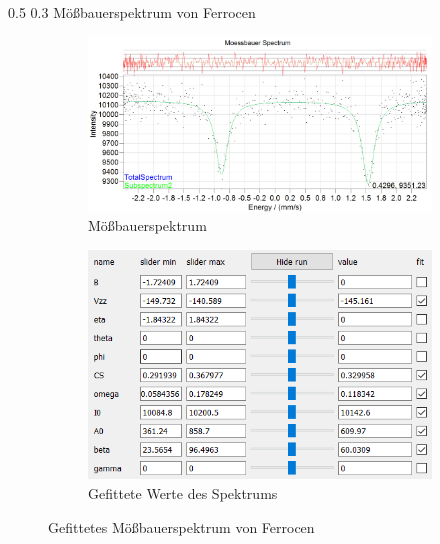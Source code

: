 \documentclass[german, %
parskip=full, %
bibliography=totoc, %
]{scrartcl}
\makeatletter
\renewcommand\subsection{\@startsection 
   {subsection}{2}{0mm}%
   {0.5\baselineskip}%
   {0.3\baselineskip}%
   {\bfseries\sffamily\large}%
   }
\makeatother
\begin{document}
\subsection{Mößbauerspektrum von Ferrocen}

\begin{figure}[ht]
	\centering
	\begin{subfigure}[b]{0.5\textwidth}
		\includegraphics[width=\textwidth]{MoessbauerFerrocen}
	  \caption{Mößbauerspektrum}
	  \label{fig:moessferrocen}
  \end{subfigure}
  \begin{subfigure}[b]{0.4\textwidth}
	  \includegraphics[width=\textwidth]{WerteFerrocen}
	  \caption{Gefittete Werte des Spektrums}
	  \label{fig:werteferrocen}
  \end{subfigure}
	\caption{Gefittetes Mößbauerspektrum von Ferrocen}
\end{figure}
\end{document}
